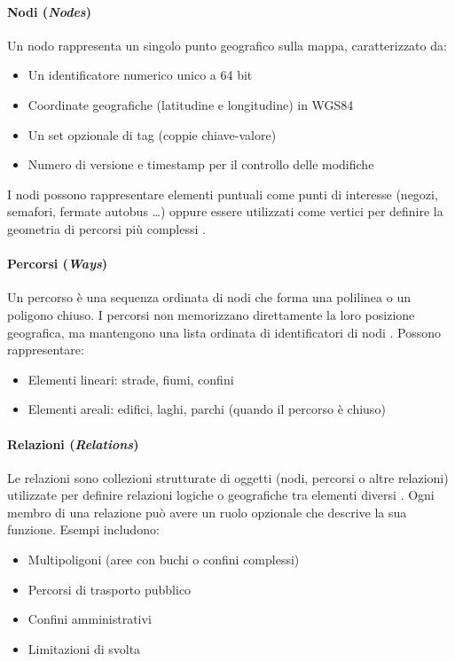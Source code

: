 \paragraph{Nodi (\textit{Nodes})}

Un nodo rappresenta un singolo punto geografico sulla mappa, caratterizzato da:
\begin{itemize}
\item Un identificatore numerico unico a 64 bit
\item Coordinate geografiche (latitudine e longitudine) in WGS84
\item Un set opzionale di tag (coppie chiave-valore)
\item Numero di versione e timestamp per il controllo delle modifiche
\end{itemize}

I nodi possono rappresentare elementi puntuali come punti di interesse (negozi, semafori, fermate autobus \dots) oppure essere utilizzati come vertici per definire la geometria di percorsi più complessi \cite{osmdata2024}.

\paragraph{Percorsi (\textit{Ways})}
Un percorso è una sequenza ordinata di nodi che forma una polilinea o un poligono chiuso. I percorsi non memorizzano direttamente la loro posizione geografica, ma mantengono una lista ordinata di identificatori di nodi \cite{osmdata2024}. Possono rappresentare:
\begin{itemize}
\item Elementi lineari: strade, fiumi, confini
\item Elementi areali: edifici, laghi, parchi (quando il percorso è chiuso)
\end{itemize}

\paragraph{Relazioni (\textit{Relations})}
Le relazioni sono collezioni strutturate di oggetti (nodi, percorsi o altre relazioni) utilizzate per definire relazioni logiche o geografiche tra elementi diversi \cite{relations2024}. Ogni membro di una relazione può avere un ruolo opzionale che descrive la sua funzione. Esempi includono:
\begin{itemize}
\item Multipoligoni (aree con buchi o confini complessi)
\item Percorsi di trasporto pubblico
\item Confini amministrativi
\item Limitazioni di svolta
\end{itemize}

